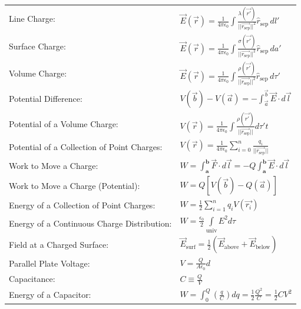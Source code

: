 \documentclass{article}
\newcommand{\sepvec}{\vec{r_\textrm{sep}}}
\newcommand{\sephat}{\hat{r}_{\textrm{sep}}}
\newcommand{\kfrac}{\frac{1}{4\pi\epsilon_0}}
\newcommand{\bfrac}[2]{\left(\frac{#1}{#2}\right)}
\newcommand{\formbox}[2]{\begin{center} \begin{tcolorbox}[title = #1, boxrule=2pt,arc=3.4pt,boxsep=0mm] #2\end{tcolorbox}\end{center}}
\begin{document}
\begin{multicols*}{2}
    \formbox{Electrostatics Basics}{
        {\renewcommand{\arraystretch}{1.75}%
        \begin{tabular}{ m{12em} m{25em}  }
            Line Charge: & $\displaystyle \vec{E}(\vec{r}) = \frac{1}{4 \pi \epsilon_0}\int{\frac{\lambda(\vec{r'})}{||\sepvec||^2}\sephat \, dl'}$\\
            Surface Charge: & $\displaystyle \vec{E}(\vec{r}) = \frac{1}{4\pi\epsilon_0}\int{\frac{\sigma(\vec{r'})}{||\sepvec||^2}\sephat \, da'}$\\
            Volume Charge: & $\displaystyle \vec{E}(\vec{r}) = \frac{1}{4\pi\epsilon_0}\int{\frac{\rho(\vec{r'})}{||\sepvec||^2}\sephat \, d\tau'}$\\
            Potential Difference: & $\displaystyle V(\vec{b}) - V(\vec{a}) = - \int_{\vec{a}}^{\vec{b}}{\vec{E} \cdot d\vec{l}}$\\
            Potential of a Volume Charge: & $\displaystyle V(\vec{r}) = \kfrac \int{\frac{\rho(\vec{r'})}{||\sepvec||}d\tau'}t$\\
            Potential of a Collection of Point Charges: & $\displaystyle V(\vec{r}) = \kfrac \sum_{i = 0}^n\frac{q_i}{||\sepvec||}$\\
            Work to Move a Charge: & $\displaystyle {W = \int_{\textbf{a}}^{\textbf{b}} \vec{F} \cdot d\vec{l} = -Q\int_{\textbf{a}}^{\textbf{b}}{\vec{E} \cdot d\vec{l}}}$\\
            Work to Move a Charge (Potential): & $\displaystyle {W= Q[V(\vec{b}) - Q(\vec{a})]}$\\
            Energy of a Collection of Point Charges: & $\displaystyle W = \frac{1}{2}\sum_{i = 1}^n{q_i V(\vec{r_i})}$\\
            Energy of a Continuous Charge Distribution: & $\displaystyle W = \frac{\epsilon_0}{2}\int\limits_{\textrm{univ}}E^2 d\tau$\\
            Field at a Charged Surface: & $\displaystyle \vec{E}_\textrm{surf} = \frac{1}{2} \left( \vec{E}_\textrm{above} + \vec{E}_\textrm{below}\right)$\\
            Parallel Plate Voltage: & $\displaystyle V = \frac{Q}{A\epsilon_0}d$\\
            Capacitance: & $\displaystyle C \equiv \frac{Q}{V}$\\
            Energy of a Capacitor: & $\displaystyle W = \int_0^Q{\bfrac{q}{C}dq} = \frac{1}{2}\frac{Q^2}{C} = \frac{1}{2} CV^2$\\


\end{tabular}}}
\end{multicols*}
\end{document}
